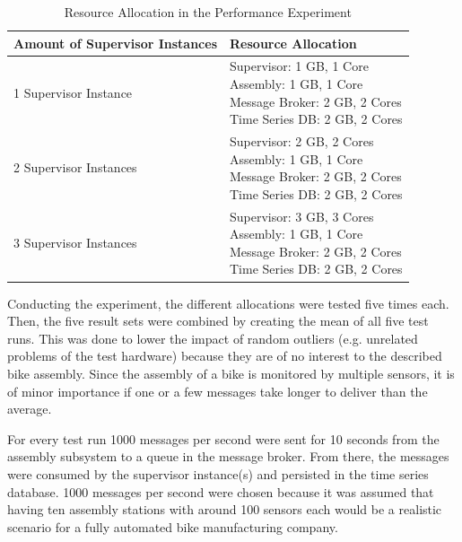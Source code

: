 \documentclass[conference]{IEEEtran}
\begin{document}
\begin{table}[htbp]
\caption{Resource Allocation in the Performance Experiment}
\begin{center}
\begin{tabular}{|l|l|}
\hline
\textbf{Amount of Supervisor Instances}  & \textbf{Resource Allocation} \\ \hline
1 Supervisor Instance  & \makecell[l]{
    Supervisor: 1 GB, 1 Core\\
    Assembly: 1 GB, 1 Core\\
    Message Broker: 2 GB, 2 Cores\\
    Time Series DB: 2 GB, 2 Cores
}   \\ \hline
2 Supervisor Instances & \makecell[l]{
    Supervisor: 2 GB, 2 Cores\\
    Assembly: 1 GB, 1 Core\\
    Message Broker: 2 GB, 2 Cores\\
    Time Series DB: 2 GB, 2 Cores
}          \\ \hline
3 Supervisor Instances & \makecell[l]{
    Supervisor: 3 GB, 3 Cores\\
    Assembly: 1 GB, 1 Core\\
    Message Broker: 2 GB, 2 Cores\\
    Time Series DB: 2 GB, 2 Cores
}        \\ \hline
\end{tabular}
\end{center}
\label{tab:experiement-a-resource-allocation}
\end{table}

Conducting the experiment, the different allocations were tested five times each. Then, the five result sets were combined by creating the mean of all five test runs. This was done to lower the impact of random outliers (e.g. unrelated problems of the test hardware) because they are of no interest to the described bike assembly. Since the assembly of a bike is monitored by multiple sensors, it is of minor importance if one or a few messages take longer to deliver than the average.

For every test run 1000 messages per second were sent for 10 seconds from the assembly subsystem to a queue in the message broker. From there, the messages were consumed by the supervisor instance(s) and persisted in the time series database. 1000 messages per second were chosen because it was assumed that having ten assembly stations with around 100 sensors each would be a realistic scenario for a fully automated bike manufacturing company.
\end{document}
